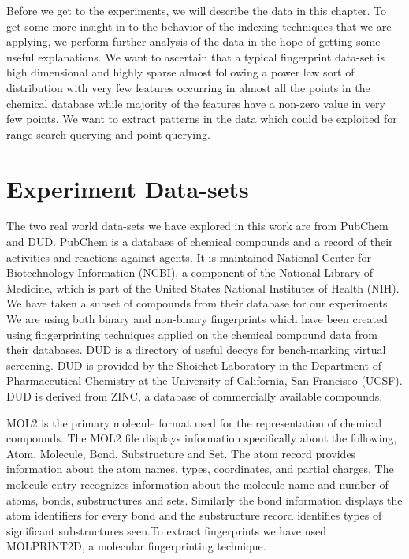 Before we get to the experiments, we will describe the data in this chapter. To get some more insight in to the behavior of the indexing techniques that we are applying, we perform further analysis of the data in the hope of getting some useful explanations. We want to ascertain that a typical fingerprint data-set is high dimensional and highly sparse almost following a power law sort of distribution with very few features occurring in almost all the points in the chemical database while majority of the features have a non-zero value in very few points. We want to extract patterns in the data which could be exploited for range search querying and point querying.\\

\section{Experiment Data-sets}

The two real world data-sets we have explored in this work are from PubChem and DUD. PubChem is a database of chemical compounds and a record of their activities and reactions against agents. It is maintained National Center for Biotechnology Information (NCBI), a component of the National Library of Medicine, which is part of the United States National Institutes of Health (NIH). We have taken a subset of compounds from their database for our experiments. We are using both binary and non-binary fingerprints which have been created using fingerprinting techniques applied on the chemical compound data from their databases. DUD is a directory of useful decoys for bench-marking virtual screening. DUD is provided by the Shoichet Laboratory in the Department of Pharmaceutical Chemistry at the University of California, San Francisco (UCSF). DUD is derived from ZINC, a database of commercially available compounds. 

MOL2 is the primary molecule format used for the representation of chemical compounds. The MOL2 file displays information specifically about the following, Atom, Molecule, Bond, Substructure and Set. The atom record provides information about the atom names, types, coordinates, and partial charges. The molecule entry recognizes information about the molecule name and number of atoms, bonds, substructures and sets. Similarly the bond information displays the atom identifiers for every bond and the substructure record identifies types of significant substructures seen.To extract fingerprints we have used MOLPRINT2D, a molecular fingerprinting technique.

